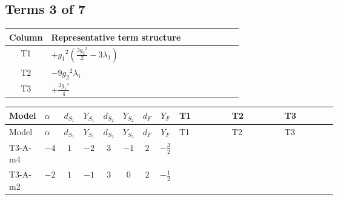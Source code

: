 \documentclass[8pt]{article}
\begin{document}
\begin{landscape}
\subsection*{Terms 3 of 7}
\begin{center}
\begin{tabular}{@{}c >{\raggedright\arraybackslash}p{0.82\linewidth}@{}}
\toprule
Column & Representative term structure \\
\midrule
T1 & \(\displaystyle +{g_1}^2 \left(\frac{3 {g_2}^2}{2}-3 {\lambda_1}\right)\) \\
\midrule
T2 & \(\displaystyle -9 {g_2}^2 {\lambda_1}\) \\
\midrule
T3 & \(\displaystyle +\frac{3 {g_1}^4}{4}\) \\
\midrule
\bottomrule
\end{tabular}
\end{center}
\smallskip
\tiny
\begin{longtable}{@{}llcccccc >{\raggedright\arraybackslash}p{0.21\linewidth} >{\raggedright\arraybackslash}p{0.21\linewidth} >{\raggedright\arraybackslash}p{0.21\linewidth}@{}}
\toprule
Model & $\alpha$ & $d_{S_1}$ & $Y_{S_1}$ & $d_{S_2}$ & $Y_{S_2}$ & $d_F$ & $Y_F$ & T1 & T2 & T3 \\
\midrule
\endfirsthead
\toprule
Model & $\alpha$ & $d_{S_1}$ & $Y_{S_1}$ & $d_{S_2}$ & $Y_{S_2}$ & $d_F$ & $Y_F$ & T1 & T2 & T3 \\
\midrule
\endhead
T3-A-m4 & $-4$ & $1$ & $-2$ & $3$ & $-1$ & $2$ & $-\frac{3}{2}$ & \scriptsize\adjustbox{max width=\linewidth}{$\begin{gathered} +{g_1}^2 \left(\frac{3 {g_2}^2}{2}-3 {\lambda_1}\right)\end{gathered}$} & \scriptsize\adjustbox{max width=\linewidth}{$\begin{gathered} -9 {g_2}^2 {\lambda_1}\end{gathered}$} & \scriptsize\adjustbox{max width=\linewidth}{$\begin{gathered} +\frac{3 {g_1}^4}{4}\end{gathered}$} \\
\midrule
T3-A-m2 & $-2$ & $1$ & $-1$ & $3$ & $0$ & $2$ & $-\frac{1}{2}$ & \scriptsize\adjustbox{max width=\linewidth}{$\begin{gathered} +{g_1}^2 \left(\frac{3 {g_2}^2}{2}-3 {\lambda_1}\right)\end{gathered}$} & \scriptsize\adjustbox{max width=\linewidth}{$\begin{gathered} -9 {g_2}^2 {\lambda_1}\end{gathered}$} & \scriptsize\adjustbox{max width=\linewidth}{$\begin{gathered} +\frac{3 {g_1}^4}{4}\end{gathered}$} \\

\end{longtable}
\end{landscape}
\end{document}
